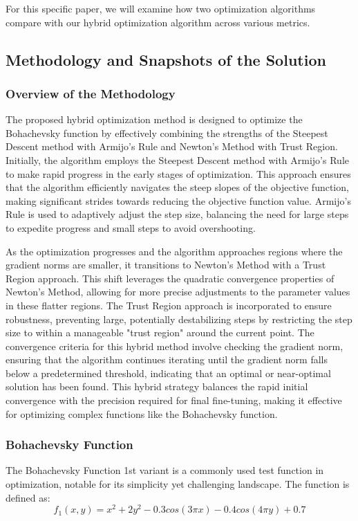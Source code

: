 \documentclass{article} %
\theoremstyle{definition}
\theoremstyle{remark}
\theoremstyle{plain}
\begin{document}
        For this specific paper, we will examine how two optimization algorithms compare with our hybrid optimization algorithm across various metrics.

\subsection{Methodology and Snapshots of the Solution}
    \subsubsection{Overview of the Methodology}
        
        The proposed hybrid optimization method is designed to optimize the Bohachevsky function by effectively combining the strengths of the Steepest Descent method with Armijo's Rule and Newton's Method with Trust Region. Initially, the algorithm employs the Steepest Descent method with Armijo's Rule to make rapid progress in the early stages of optimization. This approach ensures that the algorithm efficiently navigates the steep slopes of the objective function, making significant strides towards reducing the objective function value. Armijo's Rule is used to adaptively adjust the step size, balancing the need for large steps to expedite progress and small steps to avoid overshooting.
        
        As the optimization progresses and the algorithm approaches regions where the gradient norms are smaller, it transitions to Newton's Method with a Trust Region approach. This shift leverages the quadratic convergence properties of Newton's Method, allowing for more precise adjustments to the parameter values in these flatter regions. The Trust Region approach is incorporated to ensure robustness, preventing large, potentially destabilizing steps by restricting the step size to within a manageable "trust region" around the current point. The convergence criteria for this hybrid method involve checking the gradient norm, ensuring that the algorithm continues iterating until the gradient norm falls below a predetermined threshold, indicating that an optimal or near-optimal solution has been found. This hybrid strategy balances the rapid initial convergence with the precision required for final fine-tuning, making it effective for optimizing complex functions like the Bohachevsky function.

    \subsubsection{Bohachevsky Function}
        The Bohachevsky Function 1st variant is a commonly used test function in optimization, notable for its simplicity yet challenging landscape. The function is defined as:
        \[
            f_1(x,y) = x^2 + 2y^2 - 0.3cos(3\pi x) - 0.4cos(4 \pi y) + 0.7
        \]
\end{document}
